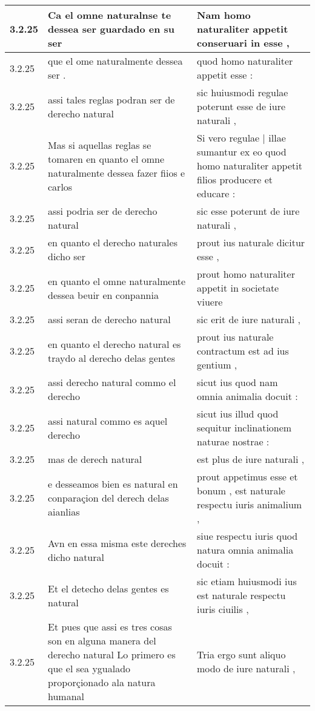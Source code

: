 \begin{tabular}{|p{1cm}|p{6.5cm}|p{6.5cm}|}
3.2.25 & Ca el omne naturalnse te dessea ser guardado en su ser & Nam homo naturaliter appetit conseruari in esse , \\\hline
3.2.25 & que el ome naturalmente dessea ser . & quod homo naturaliter appetit esse : \\\hline
3.2.25 & assi tales reglas podran ser de derecho natural & sic huiusmodi regulae poterunt esse de iure naturali , \\\hline
3.2.25 & Mas si aquellas reglas se tomaren en quanto el omne naturalmente dessea fazer fiios e carlos & Si vero regulae | illae sumantur ex eo quod homo naturaliter appetit filios producere et educare : \\\hline
3.2.25 & assi podria ser de derecho natural & sic esse poterunt de iure naturali , \\\hline
3.2.25 & en quanto el derecho naturales dicho ser & prout ius naturale dicitur esse , \\\hline
3.2.25 & en quanto el omne naturalmente dessea beuir en conpannia & prout homo naturaliter appetit in societate viuere \\\hline
3.2.25 & assi seran de derecho natural & sic erit de iure naturali , \\\hline
3.2.25 & en quanto el derecho natural es traydo al derecho delas gentes & prout ius naturale contractum est ad ius gentium , \\\hline
3.2.25 & assi derecho natural commo el derecho & sicut ius quod nam omnia animalia docuit : \\\hline
3.2.25 & assi natural commo es aquel derecho & sicut ius illud quod sequitur inclinationem naturae nostrae : \\\hline
3.2.25 & mas de derech natural & est plus de iure naturali , \\\hline
3.2.25 & e desseamos bien es natural en conparaçion del derech delas aianlias & prout appetimus esse et bonum , est naturale respectu iuris animalium , \\\hline
3.2.25 & Avn en essa misma este dereches dicho natural & siue respectu iuris quod natura omnia animalia docuit : \\\hline
3.2.25 & Et el detecho delas gentes es natural & sic etiam huiusmodi ius est naturale respectu iuris ciuilis , \\\hline
3.2.25 & Et pues que assi es tres cosas son en alguna manera del derecho natural Lo primero es que el sea ygualado proporçionado ala natura humanal & Tria ergo sunt aliquo modo de iure naturali , \\\hline

\end{tabular}
